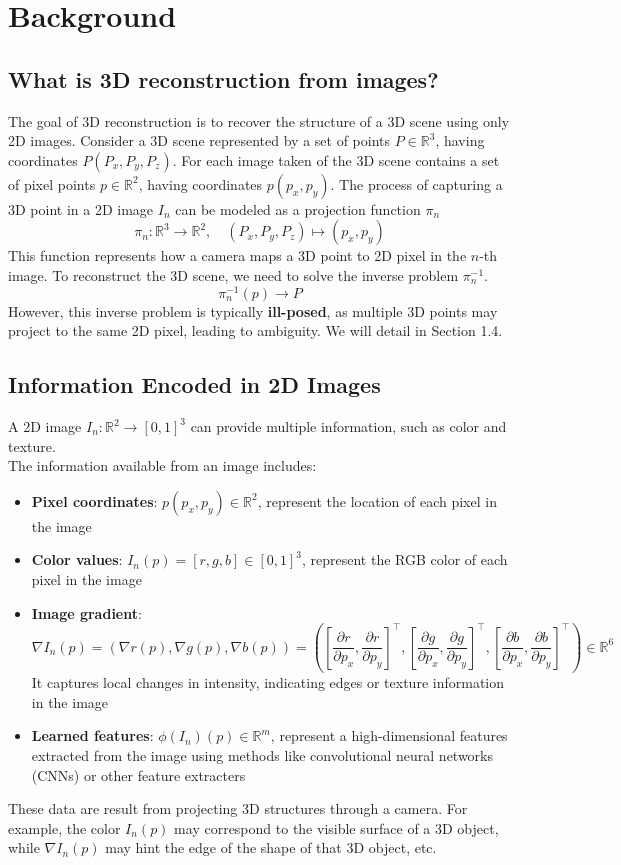 \documentclass[12pt]{article}
\begin{document}
\section{Background}
\subsection{What is 3D reconstruction from images?}

The goal of 3D reconstruction is to recover the structure of a 3D scene using only 2D images.
Consider a 3D scene represented by a set of points $P \in \mathbb{R}^3$, having coordinates $P(P_x,P_y,P_z)$.
For each image taken of the 3D scene contains a set of pixel points $p \in \mathbb{R}^2$, having coordinates $p(p_x,p_y)$.
The process of capturing a 3D point in a 2D image $I_n$ can be modeled as a projection function $\pi_n$
\[
\pi_n: \mathbb{R}^3 \to \mathbb{R}^2, \quad (P_x, P_y, P_z) \mapsto (p_x, p_y)
\]
This function represents how a camera maps a 3D point to 2D pixel in the $n$-th image.
To reconstruct the 3D scene, we need to solve the inverse problem $\pi_n^{-1}$.
\[
\pi_n^{-1}(p) \to P
\]
However, this inverse problem is typically \textbf{ill-posed}, as multiple 3D points may project to the same 2D pixel, leading to ambiguity. We will detail in Section 1.4. 

\subsection{Information Encoded in 2D Images}
A 2D image $I_n: \mathbb{R}^2 \to [0,1]^3$ can provide multiple information, such as color and texture. 
\\
The information available from an image includes:
\begin{itemize}
    \item   \textbf{Pixel coordinates}: $p(p_x,p_y) \in \mathbb{R}^2$, represent the location of each pixel in the image
    \item   \textbf{Color values}: $I_n(p) = [r,g,b] \in [0,1]^3$, represent the RGB color of each pixel in the image
    \item   \textbf{Image gradient}: 
                \[
                \nabla I_n(p) = \left( \nabla r(p), \nabla g(p), \nabla b(p) \right) = \left( \left[ \frac{\partial r}{\partial p_x}, \frac{\partial r}{\partial p_y} \right]^\top, \left[ \frac{\partial g}{\partial p_x}, \frac{\partial g}{\partial p_y} \right]^\top, \left[ \frac{\partial b}{\partial p_x}, \frac{\partial b}{\partial p_y} \right]^\top \right) \in \mathbb{R}^6
                \]
            It captures local changes in intensity, indicating edges or texture information in the image
    \item   \textbf{Learned features}: $\phi(I_n)(p) \in \mathbb{R}^m$, represent a high-dimensional features extracted from the image using methods like convolutional neural networks (CNNs) or other feature extracters
\end{itemize}
These data are result from projecting 3D structures through a camera. For example, the color $I_n(p)$ may correspond to the visible surface of a 3D object, while $\nabla I_n(p)$ may hint the edge of the shape of that 3D object, etc.
\end{document}
